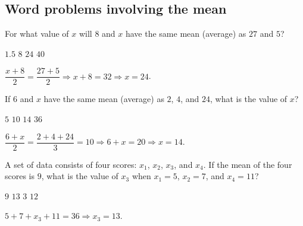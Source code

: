 
\newpage\subsection*{Word problems involving the mean}

\question[5]
For what value of $x$ will $8$ and $x$ have the same mean (average) as $27$ and $5$?
\begin{choices}
  \choice $1.5$
  \choice $8$
  \CorrectChoice $24$
  \choice $40$
\end{choices}
\begin{solution}
  $\dfrac{x+8}{2}=\dfrac{27+5}{2}\Rightarrow x+8=32\Rightarrow x=24$.
\end{solution}

\question[5]
If $6$ and $x$ have the same mean (average) as $2$, $4$, and $24$, what is the value of $x$?
\begin{choices}
  \choice $5$
  \choice $10$
  \CorrectChoice $14$
  \choice $36$
\end{choices}
\begin{solution}
  $\dfrac{6+x}{2}=\dfrac{2+4+24}{3}=10\Rightarrow 6+x=20\Rightarrow x=14$.
\end{solution}

\question[5]
A set of data consists of four scores: $x_{1}$, $x_{2}$, $x_{3}$, and $x_{4}$. If the mean of the four scores is $9$, what is the value of $x_{3}$ when $x_{1}=5$, $x_{2}=7$, and $x_{4}=11$?
\begin{choices}
  \choice $9$
  \CorrectChoice $13$
  \choice $3$
  \choice $12$
\end{choices}
\begin{solution}
  $5+7+x_{3}+11=36\Rightarrow x_{3}=13$.
\end{solution}

